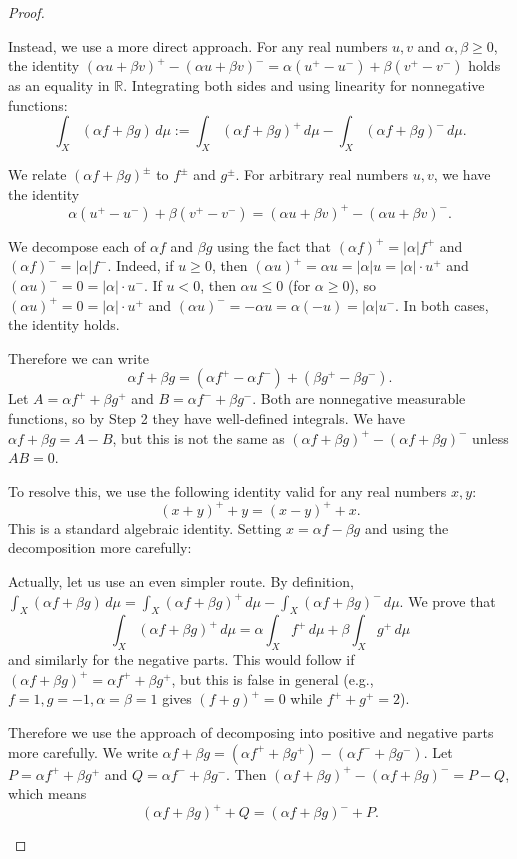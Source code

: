 \begin{proof}
\begin{enumerate}
    Instead, we use a more direct approach. For any real numbers $u,v$ and $\alpha,\beta \geq 0$, the identity $(\alpha u + \beta v)^+ - (\alpha u + \beta v)^- = \alpha(u^+ - u^-) + \beta(v^+ - v^-)$ holds as an equality in $\mathbb{R}$. Integrating both sides and using linearity for nonnegative functions:
    $$\int_X (\alpha f + \beta g)\,d\mu := \int_X (\alpha f + \beta g)^+\,d\mu - \int_X (\alpha f + \beta g)^-\,d\mu.$$

    We relate $(\alpha f + \beta g)^\pm$ to $f^\pm$ and $g^\pm$. For arbitrary real numbers $u,v$, we have the identity
    $$\alpha(u^+ - u^-) + \beta(v^+ - v^-) = (\alpha u + \beta v)^+ - (\alpha u + \beta v)^-.$$

    We decompose each of $\alpha f$ and $\beta g$ using the fact that $(\alpha f)^+ = |\alpha|f^+$ and $(\alpha f)^- = |\alpha|f^-$. Indeed, if $u \geq 0$, then $(\alpha u)^+ = \alpha u = |\alpha|u = |\alpha|\cdot u^+$ and $(\alpha u)^- = 0 = |\alpha|\cdot u^-$. If $u < 0$, then $\alpha u \leq 0$ (for $\alpha \geq 0$), so $(\alpha u)^+ = 0 = |\alpha|\cdot u^+$ and $(\alpha u)^- = -\alpha u = \alpha(-u) = |\alpha|u^-$. In both cases, the identity holds.

    Therefore we can write $$\alpha f + \beta g = (\alpha f^+ - \alpha f^-) + (\beta g^+ - \beta g^-).$$ Let $A = \alpha f^+ + \beta g^+$ and $B = \alpha f^- + \beta g^-$. Both are nonnegative measurable functions, so by Step 2 they have well-defined integrals. We have $\alpha f + \beta g = A - B$, but this is not the same as $(\alpha f+\beta g)^+ - (\alpha f+\beta g)^-$ unless $AB = 0$.

    To resolve this, we use the following identity valid for any real numbers $x,y$:
    $$(x+y)^+ + y = (x-y)^+ + x.$$ This is a standard algebraic identity. Setting $x = \alpha f - \beta g$ and using the decomposition more carefully:

    Actually, let us use an even simpler route. By definition, $\int_X (\alpha f + \beta g)\,d\mu = \int_X (\alpha f + \beta g)^+\,d\mu - \int_X (\alpha f + \beta g)^-\,d\mu$. We prove that
    $$\int_X (\alpha f + \beta g)^+\,d\mu = \alpha \int_X f^+\,d\mu + \beta \int_X g^+\,d\mu$$ and similarly for the negative parts. This would follow if $(\alpha f + \beta g)^+ = \alpha f^+ + \beta g^+$, but this is false in general (e.g., $f=1,g=-1,\alpha=\beta=1$ gives $(f+g)^+=0$ while $f^++g^+=2$).

    Therefore we use the approach of decomposing into positive and negative parts more carefully. We write $\alpha f + \beta g = (\alpha f^+ + \beta g^+) - (\alpha f^- + \beta g^-)$. Let $P = \alpha f^+ + \beta g^+$ and $Q = \alpha f^- + \beta g^-$. Then $(\alpha f + \beta g)^+ - (\alpha f + \beta g)^- = P - Q$, which means $$(\alpha f + \beta g)^+ + Q = (\alpha f + \beta g)^- + P.$$


\end{enumerate}
\end{proof}
